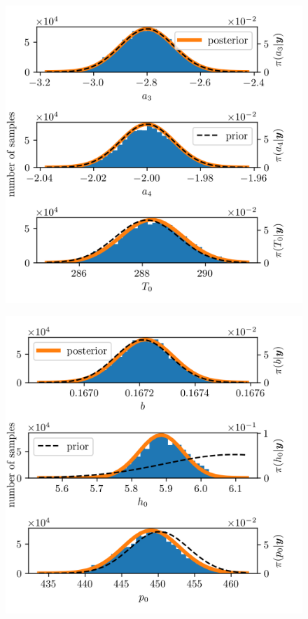 \begin{figure}[ht!]
	\centering
	\includegraphics{PHdPTPost3.png}
	\caption[]{}
	\label{fig:}
\end{figure}
\begin{figure}[ht!]
	\centering
	\includegraphics{PHdPTPost4.png}
	\caption[]{}
	\label{fig:}
\end{figure}

